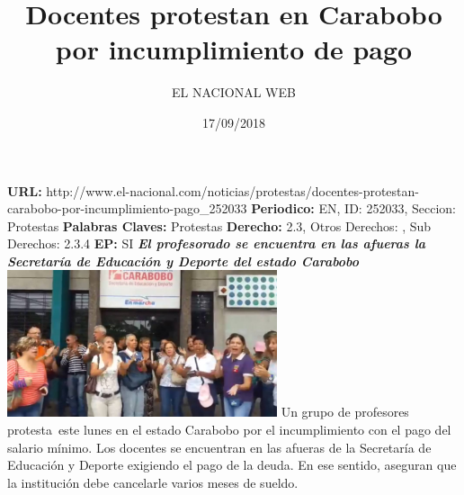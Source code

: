 \documentclass{article}%
\title{\textbf{Docentes protestan en Carabobo por incumplimiento de pago}}%
\author{EL NACIONAL WEB}%
\date{17/09/2018}%
\begin{document}
%
\normalsize%
\maketitle%
\textbf{URL: }%
http://www.el{-}nacional.com/noticias/protestas/docentes{-}protestan{-}carabobo{-}por{-}incumplimiento{-}pago\_252033\newline%
%
\textbf{Periodico: }%
EN, %
ID: %
252033, %
Seccion: %
Protestas\newline%
%
\textbf{Palabras Claves: }%
Protestas\newline%
%
\textbf{Derecho: }%
2.3, %
Otros Derechos: %
, %
Sub Derechos: %
2.3.4\newline%
%
\textbf{EP: }%
SI\newline%
\newline%
%
\textbf{\textit{El profesorado se encuentra en las afueras la Secretaría de Educación y Deporte del estado Carabobo}}%
\newline%
\newline%
%
\includegraphics[width=300px]{246.jpg}%
\newline%
%
Un grupo de profesores protesta~este lunes en el estado Carabobo por el incumplimiento con el pago del salario mínimo.%
\newline%
%
Los docentes se encuentran en las afueras de la Secretaría de Educación y Deporte exigiendo el pago de la deuda.%
\newline%
%
En ese sentido, aseguran que la institución debe cancelarle varios meses de sueldo.%
\newline%
%
\end{document}
